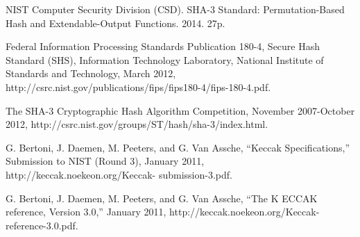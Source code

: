 \documentclass[conference]{IEEEtran}
\begin{document}
\begin{thebibliography}{9}
 NIST Computer Security Division (CSD). SHA-3 Standard:
Permutation-Based Hash and Extendable-Output Functions. 2014. 27p.

 Federal Information Processing Standards Publication 180-4,
Secure Hash Standard (SHS), Information Technology Laboratory, National
Institute of Standards and Technology, March 2012,
http://csrc.nist.gov/publications/fips/fips180-4/fips-180-4.pdf.

 The SHA-3 Cryptographic Hash Algorithm Competition, November
2007-October 2012, http://csrc.nist.gov/groups/ST/hash/sha-3/index.html.

 G. Bertoni, J. Daemen, M. Peeters, and G. Van Assche, “Keccak
Specifications,” Submission to NIST (Round 3), January 2011,
http://keccak.noekeon.org/Keccak- submission-3.pdf.

 G. Bertoni, J. Daemen, M. Peeters, and G. Van Assche, “The K
ECCAK reference, Version 3.0,” January 2011,
http://keccak.noekeon.org/Keccak-reference-3.0.pdf.
\end{thebibliography}

\smallskip
\end{document}
